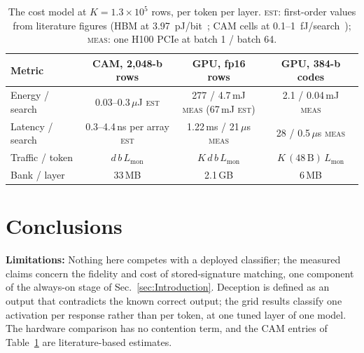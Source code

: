 \documentclass[conference]{IEEEtran}
\newcommand{\cam}{{CAM}\xspace}
\begin{document}
\begin{table}[t]
\centering
\caption{The cost model at $K=1.3\!\times\!10^{5}$ rows, per token
per layer. \textsc{est}: first-order values from literature figures
(HBM at 3.97~pJ/bit~\cite{oconnor2017fgdram}; \cam cells at
0.1--1~fJ/search~\cite{pagiamtzis2006cam,ni2019fetcam,liu2022evacam});
\textsc{meas}: one H100 PCIe at batch 1 / batch 64.}
\label{tab:costmodel}
{\scriptsize\setlength{\tabcolsep}{3pt}
\begin{tabular}{@{}lccc@{}}
\toprule
\textbf{Metric} & \textbf{\cam, 2{,}048-b rows} & \textbf{GPU, fp16 rows} &
\textbf{GPU, 384-b codes} \\
\midrule
Energy / search & \makecell[c]{0.03--0.3\,$\mu$J\\\textsc{est}} &
  \makecell[c]{277 / 4.7\,mJ\\\textsc{meas} (67\,mJ \textsc{est})} &
  \makecell[c]{2.1 / 0.04\,mJ\\\textsc{meas}} \\
Latency / search & \makecell[c]{0.3--4.4\,ns per array\\\textsc{est}} &
  \makecell[c]{1.22\,ms / 21\,$\mu$s\\\textsc{meas}} &
  \makecell[c]{28 / 0.5\,$\mu$s\\\textsc{meas}} \\
Traffic / token & $d\,b\,L_{\mathrm{mon}}$ & $K\,d\,b\,L_{\mathrm{mon}}$ &
  $K\,(48\,\mathrm{B})\,L_{\mathrm{mon}}$ \\
Bank / layer & 33\,MB & 2.1\,GB & 6\,MB \\
\bottomrule
\end{tabular}}
\end{table}

\section{Conclusions}
\label{sec:Conclusions}
\label{subsec:Limitations}
\label{subsec:Conclusions}
\textbf{Limitations:} Nothing here competes with a deployed
classifier; the measured claims concern the fidelity and cost of
stored-signature matching, one component of the always-on stage of
Sec.~\ref{sec:Introduction}. Deception is defined as an output that
contradicts the known correct output; the grid results classify one
activation per response rather than per token, at one tuned layer of
one model. The hardware comparison has no contention term, and the
\cam entries of Table~\ref{tab:costmodel} are literature-based
estimates.
\end{document}
